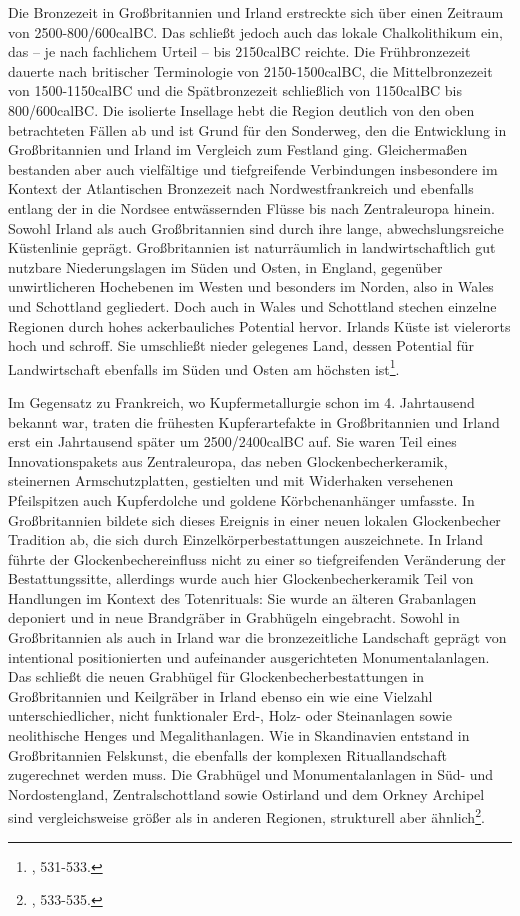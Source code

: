 \documentclass[openany,twoside,twocolumn]{book}
\let\rmarkdownfootnote\footnote%
\def\footnote{\protect\rmarkdownfootnote}
\begin{document}
Die Bronzezeit in Großbritannien und Irland erstreckte sich über einen
Zeitraum von 2500-800/600calBC. Das schließt jedoch auch das lokale
Chalkolithikum ein, das -- je nach fachlichem Urteil -- bis 2150calBC
reichte. Die Frühbronzezeit dauerte nach britischer Terminologie von
2150-1500calBC, die Mittelbronzezeit von 1500-1150calBC und die
Spätbronzezeit schließlich von 1150calBC bis 800/600calBC. Die isolierte
Insellage hebt die Region deutlich von den oben betrachteten Fällen ab
und ist Grund für den Sonderweg, den die Entwicklung in Großbritannien
und Irland im Vergleich zum Festland ging. Gleichermaßen bestanden aber
auch vielfältige und tiefgreifende Verbindungen insbesondere im Kontext
der Atlantischen Bronzezeit nach Nordwestfrankreich und ebenfalls
entlang der in die Nordsee entwässernden Flüsse bis nach Zentraleuropa
hinein. Sowohl Irland als auch Großbritannien sind durch ihre lange,
abwechslungsreiche Küstenlinie geprägt. Großbritannien ist naturräumlich
in landwirtschaftlich gut nutzbare Niederungslagen im Süden und Osten,
in England, gegenüber unwirtlicheren Hochebenen im Westen und besonders
im Norden, also in Wales und Schottland gegliedert. Doch auch in Wales
und Schottland stechen einzelne Regionen durch hohes ackerbauliches
Potential hervor. Irlands Küste ist vielerorts hoch und schroff. Sie
umschließt nieder gelegenes Land, dessen Potential für Landwirtschaft
ebenfalls im Süden und Osten am höchsten ist\footnote{\textcite{roberts_britain_2013},
  531-533.}.

Im Gegensatz zu Frankreich, wo Kupfermetallurgie schon im 4. Jahrtausend
bekannt war, traten die frühesten Kupferartefakte in Großbritannien und
Irland erst ein Jahrtausend später um 2500/2400calBC auf. Sie waren Teil
eines Innovationspakets aus Zentraleuropa, das neben
Glockenbecherkeramik, steinernen Armschutzplatten, gestielten und mit
Widerhaken versehenen Pfeilspitzen auch Kupferdolche und goldene
Körbchenanhänger umfasste. In Großbritannien bildete sich dieses
Ereignis in einer neuen lokalen Glockenbecher Tradition ab, die sich
durch Einzelkörperbestattungen auszeichnete. In Irland führte der
Glockenbechereinfluss nicht zu einer so tiefgreifenden Veränderung der
Bestattungssitte, allerdings wurde auch hier Glockenbecherkeramik Teil
von Handlungen im Kontext des Totenrituals: Sie wurde an älteren
Grabanlagen deponiert und in neue Brandgräber in Grabhügeln eingebracht.
Sowohl in Großbritannien als auch in Irland war die bronzezeitliche
Landschaft geprägt von intentional positionierten und aufeinander
ausgerichteten Monumentalanlagen. Das schließt die neuen Grabhügel für
Glockenbecherbestattungen in Großbritannien und Keilgräber in Irland
ebenso ein wie eine Vielzahl unterschiedlicher, nicht funktionaler Erd-,
Holz- oder Steinanlagen sowie neolithische Henges und Megalithanlagen.
Wie in Skandinavien entstand in Großbritannien Felskunst, die ebenfalls
der komplexen Rituallandschaft zugerechnet werden muss. Die Grabhügel
und Monumentalanlagen in Süd- und Nordostengland, Zentralschottland
sowie Ostirland und dem Orkney Archipel sind vergleichsweise größer als
in anderen Regionen, strukturell aber ähnlich\footnote{\textcite{roberts_britain_2013},
  533-535.}.
\end{document}
